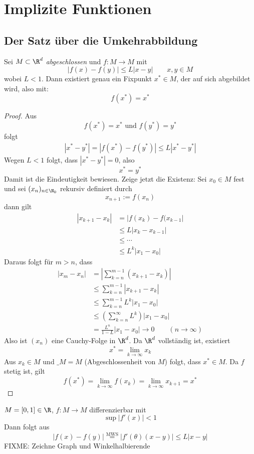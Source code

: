 \documentclass{mycourse}
\begin{document}
\chapter{Implizite Funktionen}

\section{Der Satz über die Umkehrabbildung}

\begin{st}
\label{14.1}
Sei $M\subset \R^d$ \emph{abgeschlossen} und $f:M\to M$ mit
\[
|f(x)-f(y)| \le L|x-y|	\qquad x,y\in M
\]
wobei $L<1$.
Dann existiert genau ein Fixpunkt $x^*\in M$, der auf sich abgebildet wird, also mit:
\[
f(x^*) = x^*
\]
\begin{proof}
Aus
\[
f(x^*) = x^* \text{ und } f(y^*) = y^*
\]
folgt
\begin{align*}
|x^*-y^*| = |f(x^*)-f(y^*)| \le L|x^* - y^*|
\end{align*}
Wegen $L<1$ folgt, dass $|x^*-y^*|=0$, also
\[
x^*=y^*
\]
Damit ist die Eindeutigkeit bewiesen.
Zeige jetzt die Existenz:
Sei $x_0\in M$ fest und sei $(x_n)_{n\in \N_0}$ rekursiv definiert durch
\[
x_{n+1} := f(x_n)
\]
dann gilt
\begin{align*}
|x_{k+1}-x_k| &= |f(x_k)-f(x_{k-1}|\\
&\le L|x_k -x_{k-1}|\\
&\le \cdots \\
&\le L^k|x_1-x_0|
\end{align*}
Daraus folgt für $m>n$, dass
\begin{align*}
|x_m-x_n| &= \left| \sum_{k=n}^{m-1}(x_{k+1}-x_k)\right|\\
&\le \sum_{k=n}^{m-1}|x_{k+1}-x_k|\\
&\le \sum_{k=n}^{m-1}L^k|x_1-x_0|\\
&\le \left(\sum_{k=n}^{\infty}L^k\right)|x_1-x_0|\\
&= \frac {L^n}{1-L}|x_1-x_0| \to 0 \qquad (n\to \infty)
\end{align*}
Also ist $(x_n)$ eine Cauchy-Folge in $\R^d$.
Da $\R^d$ vollständig ist, existiert
\[
x^* = \lim_{k\to \infty}x_k
\]
Aus $x_k\in M$ und $\_{M}=M$ (Abgeschlossenheit von $M$) folgt, dass $x^*\in M$.
Da $f$ stetig ist, gilt
\[
f(x^*) = \lim_{k\to \infty}f(x_k) =\lim_{k\to \infty}x_{k+1} = x^*
\]
\end{proof}
\end{st}

\begin{ex*}
$M=[0,1]\in \R$, $f:M\to M$ differenzierbar mit
\[
\sup |f'(x)| <1
\]
Dann folgt aus
\[
|f(x)-f(y)| \stackrel{\text{MWS}}= |f'(\theta)(x-y)| \le L|x-y|
\]
FIXME: Zeichne Graph und Winkelhalbierende

\end{ex*}
\end{document}
